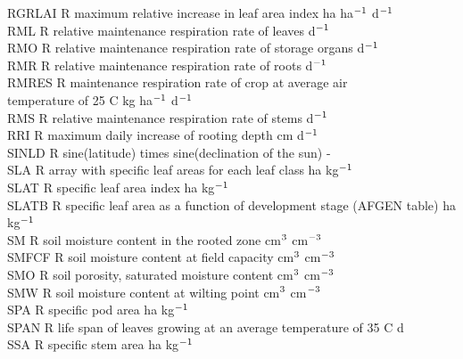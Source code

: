 \documentclass[11pt]{article}
\begin{document}
\begin{tabbing}
RGRLAI\> \> R\> maximum relative increase in leaf area index\> \> \> \> \> \> \> ha ha$^{{\rm -1}}$ d$^{{\rm -1}}$\\
RML\> \> R\> relative maintenance respiration rate of leaves\> \> \> \> \> \> \> d$^{{\rm -1}}$\\
RMO\> \> R\> relative maintenance respiration rate of storage organs\> \> \> \> \> \> \> d$^{{\rm -1}}$\\
RMR\> \> R\> relative maintenance respiration rate of roots\> \> \> \> \> \> \> d$^{{\rm -1}}$ \\
 RMRES   \> \> R   \> maintenance respiration rate of crop at average air \\
\>\> \> temperature of 25 \degrees C \> \> \> \> \> \> \> kg ha$^{{\rm -1}}$ d$^{{\rm -1}}$\\
RMS\> \> R\> relative maintenance respiration rate of stems\> \> \> \> \> \> \> d$^{{\rm -1}}$\\
RRI\> \> R\> maximum daily increase of rooting depth\> \> \> \> \> \> \> cm d$^{{\rm -1}}$\\
SINLD   \> \> R   \> sine(latitude) times sine(declination of the sun)                  \> \> \> \> \> \> \> -\\
SLA     \> \> R   \> array with specific leaf areas for each leaf class       \> \> \> \> \> \> \> ha kg$^{{\rm -1}}$\\
SLAT\> \> R\> specific leaf area index\> \> \> \> \> \> \> ha kg$^{{\rm -1}}$\\
SLATB\> \> R\> specific leaf area as a function of development stage (AFGEN table)\> \> \> \> \> \> \> ha kg$^{{\rm -1}}$\\
SM\> \> R\> soil moisture content in the rooted zone\> \> \> \> \> \> \> cm$^{{\rm 3}}$ cm$^{{\rm -3}}$\\
SMFCF\> \> R\> soil moisture content at field capacity\> \> \> \> \> \> \> cm$^{{\rm 3}}$ cm$^{{\rm -3}}$\\
SMO\> \> R\> soil porosity, saturated moisture content\> \> \> \> \> \> \> cm$^{{\rm 3}}$ cm$^{{\rm -3}}$\\
SMW\> \> R\> soil moisture content at wilting point\> \> \> \> \> \> \> cm$^{{\rm 3}}$ cm$^{{\rm -3}}$\\
SPA\> \> R\> specific pod area\> \> \> \> \> \> \> ha kg$^{{\rm -1}}$\\
SPAN\> \> R\> life span of leaves growing at an average temperature of 35 \degrees C\> \> \> \> \> \> \> d\\
SSA\> \> R\> specific stem area\> \> \> \> \> \> \> ha kg$^{{\rm -1}}$\\

\end{tabbing}
\end{document}
